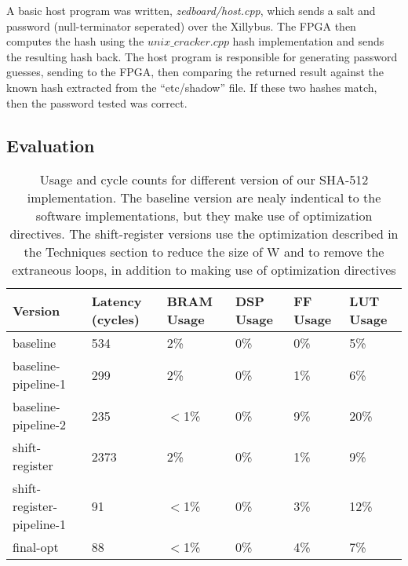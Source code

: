 A basic host program was written, \emph{zedboard/host.cpp}, which sends a
salt and password (null-terminator seperated) over the Xillybus. The FPGA then
computes the hash using the $unix\_cracker.cpp$ hash implementation
and sends the resulting hash back. The host program is responsible for
generating password guesses, sending to the FPGA, then comparing the returned
result against the known hash extracted from the ``etc/shadow'' file.
If these two hashes match, then the password tested was correct.


\subsection{Evaluation}
\begin{table}[h]
\begin{tabular}{@{}llllll@{}}
\toprule
Version                   & Latency (cycles) & BRAM Usage & DSP Usage & FF Usage & LUT Usage \\ \midrule
baseline                  & 534              & 2\%         & 0\%        & 0\%       & 5\%    \\
baseline-pipeline-1       & 299              & 2\%         & 0\%        & 1\%       & 6\%    \\
baseline-pipeline-2       & 235              & $<$1\%      & 0\%        & 9\%       & 20\%   \\
shift-register            & 2373             & 2\%         & 0\%        & 1\%       & 9\%    \\
shift-register-pipeline-1 & 91               & $<$1\%      & 0\%        & 3\%       & 12\%   \\
final-opt                 & 88               & $<$1\%      & 0\%        & 4\%       & 7\%   \\ \bottomrule
\end{tabular}
\caption{Usage and cycle counts for different version of our SHA-512 implementation. The baseline
version are nealy indentical to the software implementations, but they make use of optimization
directives. The shift-register versions use the optimization described in the Techniques section to
reduce the size of W and to remove the extraneous loops, in addition to making use of optimization
directives}
\label{table:shausage}
\end{table}

